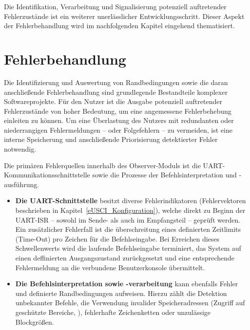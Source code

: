 Die Identifikation, Verarbeitung und Signalisierung potenziell auftretender Fehlerzust\"ande ist ein weiterer unerl\"asslicher Entwicklungsschritt. Dieser Aspekt der Fehlerbehandlung wird im nachfolgenden Kapitel eingehend thematisiert.\AI


\newpage
\section{Fehlerbehandlung}
\label{Fehlerbehandlung}

Die Identifizierung und Auswertung von Randbedingungen sowie die daran anschlie{\ss}ende Fehlerbehandlung sind grundlegende Bestandteile komplexer Softwareprojekte. F\"ur den Nutzer ist die Ausgabe potenziell auftretender Fehlerzust\"ande von hoher Bedeutung, um eine angemessene Fehlerbehebung einleiten zu k\"onnen. Um eine \"Uberlastung des Nutzers mit redundanten oder niederrangigen Fehlermeldungen -- oder Folgefehlern -- zu vermeiden, ist eine interne Speicherung und anschlie{\ss}ende Priorisierung detektierter Fehler notwendig. 

Die prim\"aren Fehlerquellen innerhalb des Observer-Moduls ist die UART- Kommunikationsschnittstelle sowie die Prozesse der Befehlsinterpretation und -ausf\"uhrung.
\begin{itemize}
	\item \textbf{Die UART-Schnittstelle} besitzt diverse Fehlerindikatoren (Fehlervektoren beschrieben in Kapitel~\ref{eUSCI_Konfiguration}), welche direkt zu Beginn der UART-ISR -- sowohl im Sende- als auch im Empfangsteil -- gepr\"uft werden. Ein zus\"atzlicher Fehlerfall ist die \"uberschreitung eines definierten Zeitlimits (Time-Out) pro Zeichen f\"ur die Befehlseingabe. Bei Erreichen dieses Schwellenwerts wird die laufende Befehlseingabe terminiert, das System auf einen deffinierten Ausgangszustand zur\"uckgesetzt und eine entsprechende Fehlermeldung an die verbundene Benutzerkonsole \"ubermittelt.
	
	\item \textbf{Die Befehlsinterpretation sowie -verarbeitung} kann ebenfalls Fehler und definierte Randbedingungen aufweisen. Hierzu z\"ahlt die Detektion unbekannter Befehle, die Verwendung invalider Speicheradressen (\zB Zugriff auf gesch\"utzte Bereiche, \Vgl {}), fehlerhafte Zeichenketten oder unzul\"assige Blockgr\"o{\ss}en.
\end{itemize}

